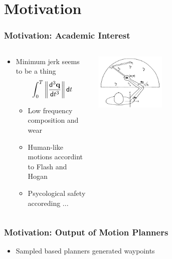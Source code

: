 \section{Motivation}

\begin{frame}[t]
	\frametitle{Motivation: Academic Interest}

	\begin{columns}
		\begin{column}{0.5\textwidth}
			\begin{itemize}
				\item Minimum jerk seems to be a thing
				      \begin{equation*}
					      \int_0^T \left\|\frac{\mathsf{d}^{3} \mathbf{q}}{\mathsf{d} t^{3}}\right\| \mathsf{d} t
				      \end{equation*}
				      \begin{itemize}
					      \item Low frequency composition and  wear
					      \item Human-like motions accordint to Flash and Hogan
					      \item Psycological safety accoreding ...
				      \end{itemize}
			\end{itemize}
		\end{column}
		\begin{column}{0.5\textwidth}
			\begin{center}
				\includegraphics[width=0.4\textwidth]{./images/flashAndHoganExperiment.png}
			\end{center}
		\end{column}
	\end{columns}
\end{frame}

\begin{frame}[t]
	\frametitle{Motivation: Output of Motion Planners}
	\begin{itemize}
		\item Sampled based planners generated waypoints
	\end{itemize}
\end{frame}

